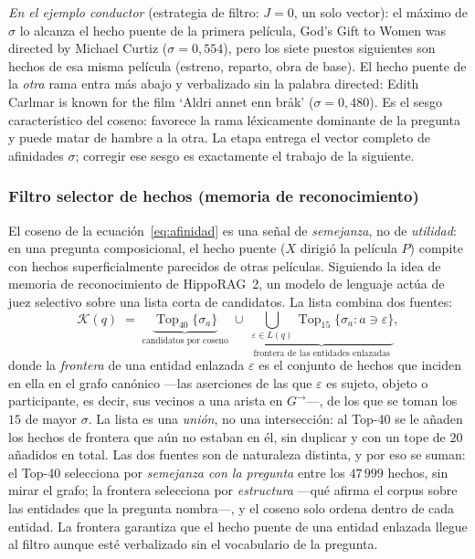 \documentclass[11pt,a4paper]{article}
\newcommand{\hippo}{HippoRAG~2}
\newcommand{\op}[1]{\operatorname{#1}}
\begin{document}
\emph{En el ejemplo conductor} (estrategia de filtro: $J=0$, un solo
vector): el máximo de $\sigma$ lo alcanza el hecho puente de la primera
película, \guillemotleft{}God's Gift to Women was directed by Michael Curtiz\guillemotright{}
($\sigma=0{,}554$), pero los siete puestos siguientes son hechos de esa
misma película (estreno, reparto, obra de base). El hecho puente de la
\emph{otra} rama entra más abajo y verbalizado sin la palabra
\guillemotleft{}directed\guillemotright{}: \guillemotleft{}Edith Carlmar is known for the film `Aldri annet enn
bråk'\guillemotright{} ($\sigma=0{,}480$). Es el sesgo característico del coseno:
favorece la rama léxicamente dominante de la pregunta y puede matar de
hambre a la otra. La etapa entrega el vector completo de afinidades
$\sigma$; corregir ese sesgo es exactamente el trabajo de la siguiente.

\subsubsection{Filtro selector de hechos (memoria de reconocimiento)}
\label{sec:filtro}

El coseno de la ecuación~\eqref{eq:afinidad} es una señal de \emph{semejanza},
no de \emph{utilidad}: en una pregunta composicional, el hecho puente
(\guillemotleft{}$X$ dirigió la película $P$\guillemotright{}) compite con hechos superficialmente
parecidos de otras películas. Siguiendo la idea de memoria de
reconocimiento de \hippo{}, un modelo de lenguaje actúa de juez selectivo
sobre una lista corta de candidatos. La lista combina dos fuentes:
\begin{equation}
\mathcal{K}(q) \;=\;
\underbrace{\op{Top}_{40}\{\sigma_a\}}_{\text{candidatos por coseno}}
\;\cup\;
\underbrace{\bigcup_{\varepsilon\in L(q)}
\op{Top}_{15}\bigl\{\sigma_a : a \ni \varepsilon\bigr\}}_{\text{frontera de las entidades enlazadas}},
\label{eq:candidatos}
\end{equation}
donde la \emph{frontera} de una entidad enlazada $\varepsilon$ es el
conjunto de hechos que inciden en ella en el grafo canónico ---las
aserciones de las que $\varepsilon$ es sujeto, objeto o participante,
es decir, sus vecinos a una arista en $G^{\!\rightarrow}$---, de los que
se toman los $15$ de mayor $\sigma$. La lista es una \emph{unión}, no
una intersección: al Top-40 se le añaden los hechos de frontera que aún
no estaban en él, sin duplicar y con un tope de $20$ añadidos en total.
Las dos fuentes son de naturaleza distinta, y por eso se suman: el
Top-40 selecciona por \emph{semejanza con la pregunta} entre los
$47\,999$ hechos, sin mirar el grafo; la frontera selecciona por
\emph{estructura} ---qué afirma el corpus sobre las entidades que la
pregunta nombra---, y el coseno solo ordena dentro de cada entidad. La
frontera garantiza que el hecho puente de una entidad enlazada llegue al
filtro aunque esté verbalizado sin el vocabulario de la pregunta.
\end{document}
